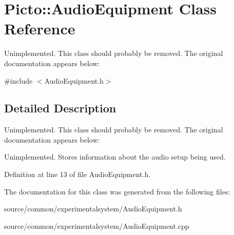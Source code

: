 \hypertarget{class_picto_1_1_audio_equipment}{\section{Picto\-:\-:Audio\-Equipment Class Reference}
\label{class_picto_1_1_audio_equipment}
}


Unimplemented. This class should probably be removed. The original documentation appears below\-:  




{\ttfamily \#include $<$Audio\-Equipment.\-h$>$}



\subsection{Detailed Description}
Unimplemented. This class should probably be removed. The original documentation appears below\-: 

Unimplemented. Stores information about the audio setup being used. 

Definition at line 13 of file Audio\-Equipment.\-h.



The documentation for this class was generated from the following files\-:\begin{DoxyCompactItemize}
\item 
source/common/experimentalsystem/Audio\-Equipment.\-h\item 
source/common/experimentalsystem/Audio\-Equipment.\-cpp\end{DoxyCompactItemize}
